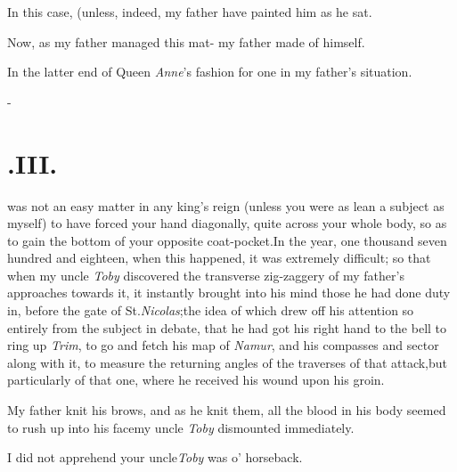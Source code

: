 \documentclass{article}
\begin{document}
In this case, (unless, indeed, my father
have painted him as he sat.

Now, as my father managed this mat-
my father made of himself.

\tsk In the latter end of Queen \textit{Anne}’s
fashion for one in my father’s situation.

\null\kern-\baselineskip
\section{.\quad  III.}

 was not an easy matter in any
king’s reign (unless you were as lean a subject as myself) to
have forced your hand diagonally, quite across your whole body, so
as to gain the bottom of your opposite coat-pocket.\tsh In
the year, one thousand seven hundred and eighteen, when this
happened, it was extremely difficult; so that when my uncle
\textit{Toby} discovered the transverse zig-zaggery of my
father’s approaches towards it, it instantly brought into his
mind those he had done duty in,\break
before the gate of St.\@ \textit{Nicolas};\tsk the\break
idea of which drew off his attention so
entirely from the subject in debate, that he had got his right
hand to the bell to ring up \textit{Trim}, to go and fetch
his map of \textit{Namur}, and his compasses and sector along with
it, to measure the returning angles of the traverses of that
attack,\tsk but particularly of that one, where he received his
wound upon his groin.

My father knit his brows, and as he knit them, all the blood in
his body seem\-ed to rush up into his face\tsh my uncle
\textit{Toby} dismounted immediately.

\tsk I did not apprehend your uncle\break \textit{Toby} was
o’ horseback.\tsh
\end{document}
